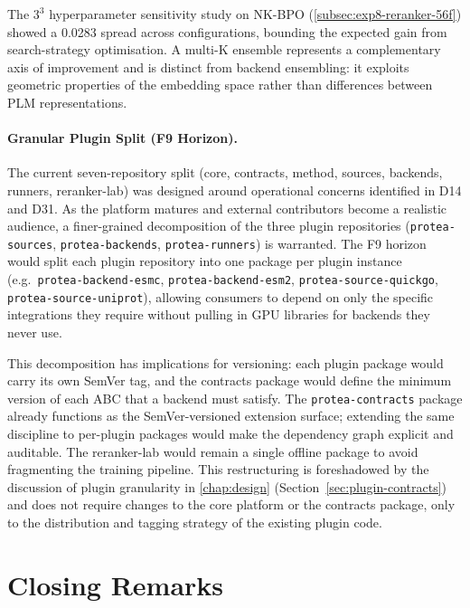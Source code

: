 The $3^3$ hyperparameter sensitivity study on NK-BPO (\cref{subsec:exp8-reranker-56f})
showed a 0.0283 spread across configurations, bounding the expected gain from
search-strategy optimisation. A multi-K ensemble represents a complementary
axis of improvement and is distinct from backend ensembling: it exploits
geometric properties of the embedding space rather than differences between PLM
representations.

\paragraph{Granular Plugin Split (F9 Horizon).}
\label{para:future-f9-plugin}

The current seven-repository split (core, contracts, method, sources,
backends, runners, reranker-lab) was designed around operational concerns
identified in D14 and D31. As the platform matures and external contributors
become a realistic audience, a finer-grained decomposition of the three plugin
repositories (\texttt{protea-sources}, \texttt{protea-backends},
\texttt{protea-runners}) is warranted. The F9 horizon would split each plugin
repository into one package per plugin instance (e.g.\
\texttt{protea-backend-esmc}, \texttt{protea-backend-esm2},
\texttt{protea-source-quickgo}, \texttt{protea-source-uniprot}), allowing
consumers to depend on only the specific integrations they require without
pulling in GPU libraries for backends they never use.

This decomposition has implications for versioning: each plugin package would
carry its own SemVer tag, and the contracts package would define the minimum
version of each ABC that a backend must satisfy. The \texttt{protea-contracts}
package already functions as the SemVer-versioned extension surface; extending
the same discipline to per-plugin packages would make the dependency graph
explicit and auditable. The reranker-lab would remain a single offline package
to avoid fragmenting the training pipeline. This restructuring is foreshadowed
by the discussion of plugin granularity in \cref{chap:design}
(Section~\ref{sec:plugin-contracts}) and does not require changes to the core
platform or the contracts package, only to the distribution and tagging
strategy of the existing plugin code.

\section{Closing Remarks}
\label{sec:conclusion-closing}

